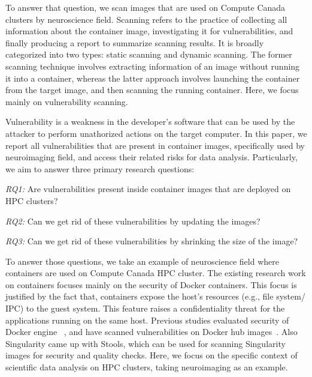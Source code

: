 \documentclass[a4paper,num-refs]{oup-contemporary}
\begin{document}
To answer that question, we scan images that are used on Compute
Canada clusters by neuroscience field. Scanning refers to the practice of
collecting all information about the container image, investigating it
for vulnerabilities, and finally producing a
report to summarize scanning results. It is broadly categorized into
two types: static scanning and dynamic scanning. The former scanning technique
involves extracting information of an image without running it into a container,
whereas the latter approach involves launching the container from the target image, and
then scanning the running container.
Here, we focus mainly on vulnerability scanning.

Vulnerability is a weakness in the developer's software that can be used
by the attacker to perform unathorized actions on the target computer.
In this paper, we report all vulnerabilities that are present in
container images, specifically used by neuroimaging field, and access their
related risks for data analysis. Particularly, we aim to answer three primary
research questions:

\textit{RQ1:} Are vulnerabilities present inside container images that are
deployed on HPC clusters?

\textit{RQ2:} Can we get rid of these vulnerabilities by updating the
images?

\textit{RQ3:} Can we get rid of these vulnerabilities by shrinking the
size of the image?

To answer those questions, we take an example of neuroscience field where
containers are used on Compute Canada HPC cluster.
The existing research work on containers focuses mainly on the security of Docker
containers.
This focus is justified by the fact that, containers expose the host's resources
(e.g., file system/ IPC) to the guest system. This feature raises a confidentiality
threat for the applications running on the same host. Previous studies evaluated
security of Docker engine ~\cite{martin2018docker, sultan2019container, combe2016docker, bui2015analysis},
and have scanned vulnerabilities on Docker hub images~\cite{Shu2017, gummaraju2015over}.
Also Singularity came up with Stools, which can be used for scanning Singularity images
for security and quality checks.
Here, we focus on the specific context of scientific data analysis on HPC clusters, taking
neuroimaging as an example.
\end{document}
